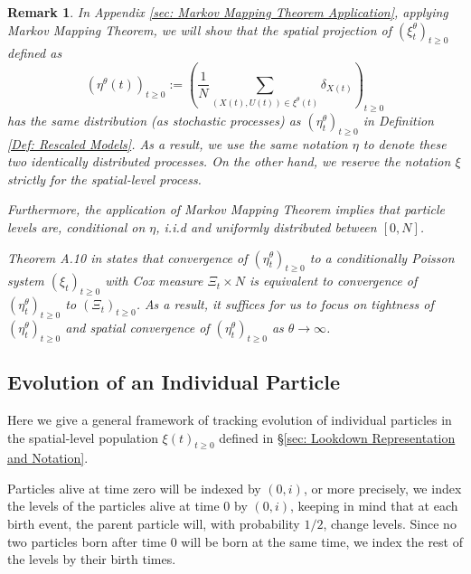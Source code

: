 \documentclass[12pt]{article}
\newtheorem{remark}[theorem]{Remark}
\begin{document}
\begin{remark}
In Appendix \ref{sec: Markov Mapping Theorem Application},
applying Markov Mapping Theorem,
we will show that the spatial projection of $(\xi^{\theta}_t)_{t \geq 0}$ defined as 
$$(\eta^{\theta}(t))_{t \geq 0}
:=\left(\frac{1}{N}\sum\limits_{(X(t),U(t))\in \xi^{\theta}(t)} \delta_{X(t)}\right)_{t \geq 0}$$
has the same distribution (as stochastic processes)
as $(\eta^{\theta}_t)_{t \geq 0}$
in Definition \ref{Def: Rescaled Models}.
As a result, we use the same notation $\eta$
to denote these two identically distributed processes.
On the other hand,
we reserve the notation $\xi$
strictly for the spatial-level process.

Furthermore, the application of Markov Mapping Theorem implies that 
particle levels are, conditional on $\eta$,
i.i.d and uniformly distributed between $[0, N]$.

Theorem A.10 in \cite{kurtz/rodrigues:2011}
states that convergence of $(\eta^{\theta}_t)_{t \geq 0}$
to a conditionally Poisson system $(\xi_t)_{t \geq 0}$
with Cox measure $\Xi_t \times N$
is equivalent to convergence of
$(\eta^{\theta}_t)_{t \geq 0}$ to $(\Xi_t)_{t \geq 0}$.
As a result, it suffices for us to focus on
tightness of $(\eta^{\theta}_t)_{t \geq 0}$
and spatial convergence of $(\eta^{\theta}_t)_{t \geq 0}$
as $\theta \to \infty$.




\end{remark}

\subsection{Evolution of an Individual Particle}
\label{sec: Evolution of an Individual Particle}

Here we give a general framework of tracking evolution
of individual particles in the spatial-level population $\xi(t)_{t \geq 0}$ defined in \S \ref{sec: Lookdown Representation and Notation}.

Particles alive at time zero will be indexed by $(0, i)$,
or more precisely,
we index the levels of the particles
alive at time $0$ by $(0, i)$,
keeping in mind that at each birth event,
the parent particle will,
with probability $1/2$, change levels.
Since no two particles born after time $0$
will be born at the same time,
we index the rest of the levels by their birth times.
\end{document}

